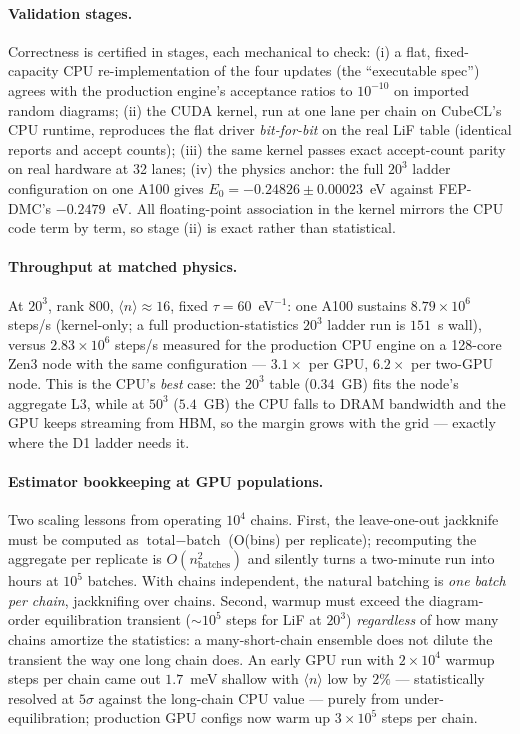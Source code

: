 \documentclass[11pt]{article}
\begin{document}
\paragraph{Validation stages.}
Correctness is certified in stages, each mechanical to check: (i) a flat, fixed-capacity
CPU re-implementation of the four updates (the ``executable spec'') agrees with the
production engine's acceptance ratios to $10^{-10}$ on imported random diagrams; (ii) the
CUDA kernel, run at one lane per chain on CubeCL's CPU runtime, reproduces the flat driver
\emph{bit-for-bit} on the real LiF table (identical reports and accept counts); (iii) the
same kernel passes exact accept-count parity on real hardware at 32 lanes; (iv) the
physics anchor: the full $20^{3}$ ladder configuration on one A100 gives
$E_{0}=-0.24826\pm0.00023$~eV against FEP-DMC's $-0.2479$~eV. All floating-point
association in the kernel mirrors the CPU code term by term, so stage (ii) is exact rather
than statistical.

\paragraph{Throughput at matched physics.}
At $20^{3}$, rank $800$, $\langle n\rangle\approx16$, fixed $\tau=60$~eV$^{-1}$: one A100
sustains $8.79\times10^{6}$ steps/s (kernel-only; a full production-statistics $20^{3}$ ladder run
is $151$~s wall), versus $2.83\times10^{6}$ steps/s measured for the production CPU engine
on a 128-core Zen3 node with the same configuration --- $3.1\times$ per GPU, $6.2\times$
per two-GPU node. This is the CPU's \emph{best} case: the $20^{3}$ table ($0.34$~GB) fits
the node's aggregate L3, while at $50^{3}$ ($5.4$~GB) the CPU falls to DRAM bandwidth and
the GPU keeps streaming from HBM, so the margin grows with the grid --- exactly where the
D1 ladder needs it.

\paragraph{Estimator bookkeeping at GPU populations.}
Two scaling lessons from operating $10^{4}$ chains. First, the leave-one-out jackknife
must be computed as $\text{total}-\text{batch}$ (O(bins) per replicate); recomputing the
aggregate per replicate is $O(n_{\mathrm{batches}}^{2})$ and silently turns a two-minute
run into hours at $10^{5}$ batches. With chains independent, the natural batching is
\emph{one batch per chain}, jackknifing over chains. Second, warmup must exceed the
diagram-order equilibration transient ($\sim\!10^{5}$ steps for LiF at $20^{3}$)
\emph{regardless} of how many chains amortize the statistics: a many-short-chain ensemble
does not dilute the transient the way one long chain does. An early GPU run with $2\times
10^{4}$ warmup steps per chain came out $1.7$~meV shallow with $\langle n\rangle$ low by
$2\%$ --- statistically resolved at $5\sigma$ against the long-chain CPU value --- purely
from under-equilibration; production GPU configs now warm up $3\times10^{5}$ steps per
chain.
\end{document}
